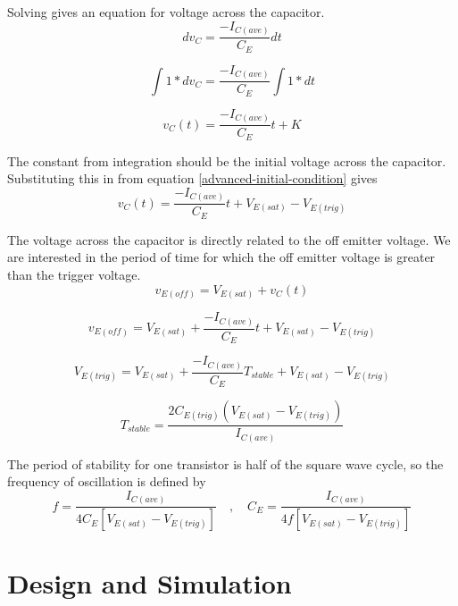 \documentclass[titlepage, letterpaper, 10.5pt]{article}
\begin{document}
Solving gives an equation for voltage across the capacitor.
\begin{equation*}
dv_{C}=\frac{-I_{C(ave)}}{C_{E}}dt
\end{equation*}

\begin{equation*}
\int 1*dv_{C}=\frac{-I_{C(ave)}}{C_{E}}\int 1*dt
\end{equation*}

\begin{equation*}
v_{C}(t)=\frac{-I_{C(ave)}}{C_{E}}t+K
\end{equation*}

The constant from integration should be the initial voltage across the capacitor.
Substituting this in from equation \ref{advanced-initial-condition} gives
\begin{equation}
v_{C}(t)=\frac{-I_{C(ave)}}{C_{E}}t+V_{E(sat)}-V_{E(trig)}
\end{equation}

The voltage across the capacitor is directly related to the off emitter voltage.
We are interested in the period of time for which the off emitter voltage is greater
than the trigger voltage.
\begin{equation*}
v_{E(off)}=V_{E(sat)}+v_{C}(t)
\end{equation*}

\begin{equation*}
v_{E(off)}=V_{E(sat)}+\frac{-I_{C(ave)}}{C_{E}}t+V_{E(sat)}-V_{E(trig)}
\end{equation*}

\begin{equation*}
V_{E(trig)}=V_{E(sat)}+\frac{-I_{C(ave)}}{C_{E}}T_{stable}+V_{E(sat)}-V_{E(trig)}
\end{equation*}

\begin{equation}
T_{stable}=\frac{2C_{E(trig)}(V_{E(sat)}-V_{E(trig)})}{I_{C(ave)}}
\end{equation}

The period of stability for one transistor is half of the square wave cycle,
so the frequency of oscillation is defined by
\begin{equation}
f=\frac{I_{C(ave)}}{4C_{E}[V_{E(sat)}-V_{E(trig)}]}
\quad, \quad
C_{E}=\frac{I_{C(ave)}}{4f[V_{E(sat)}-V_{E(trig)}]}
\label{advanced-ce-eq}
\end{equation}

\section{Design and Simulation}
\end{document}
